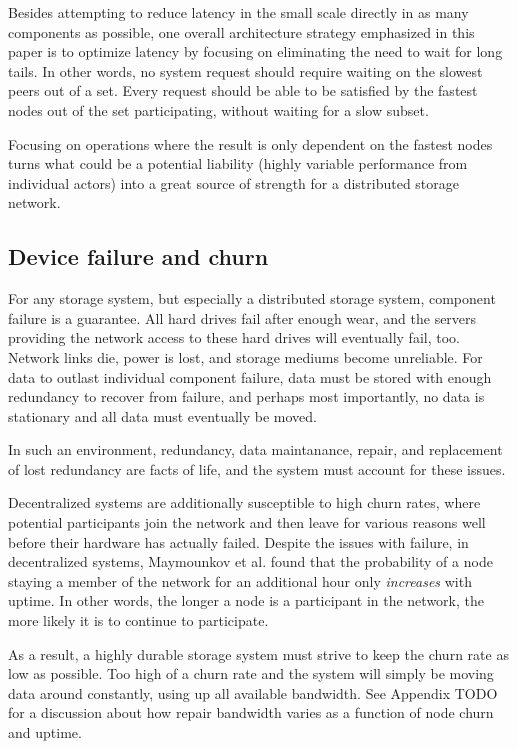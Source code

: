 \documentclass[a4paper,10pt]{article}
\newcommand{\todo}[1]{{\color{red} TODO #1}}
\begin{document}
Besides attempting to reduce latency in the small scale directly in as many
components as possible, one overall architecture strategy emphasized in this
paper is to optimize latency by focusing on eliminating the need to wait for
long tails.\cite{tail-at-scale} In other words, no system request should require
waiting on the slowest peers out of a set. Every request should be able to be
satisfied by the fastest nodes out of the set participating, without waiting
for a slow subset.

Focusing on operations where the result is only dependent on the fastest nodes
turns what could be a potential liability (highly variable performance from
individual actors) into a great source of strength for a distributed storage
network.

\subsection{Device failure and churn}

For any storage system, but especially a distributed storage system, component
failure is a guarantee. All hard drives fail
after enough wear\cite{backblaze-hd-2018-q1}, and the servers providing
the network access to these hard drives will eventually fail, too. Network
links die, power is lost, and storage mediums become unreliable. For data
to outlast individual component failure, data must be stored with enough
redundancy to recover from failure, and perhaps most importantly, no data is
stationary and all data must eventually be moved.

In such an environment, redundancy, data maintanance, repair, and replacement
of lost redundancy are facts of life, and the system must account for these
issues.

Decentralized systems are additionally susceptible to high churn rates,
where potential participants join the network and then leave for various
reasons well before their hardware has actually failed. Despite the issues with
failure, in decentralized systems, Maymounkov et al. found that
the probability of a node staying a member of the network for an additional
hour only {\em increases} with uptime.\cite{kademlia} In other words, the
longer a node is a participant in the network, the more likely it is to
continue to participate.

As a result, a highly durable storage system must strive to keep the churn rate
as low as possible. Too high of a churn rate and the system will simply be
moving data around constantly, using up all available bandwidth. See Appendix
\todo{} for a discussion about how repair bandwidth varies as a function of
node churn and uptime.
\end{document}
